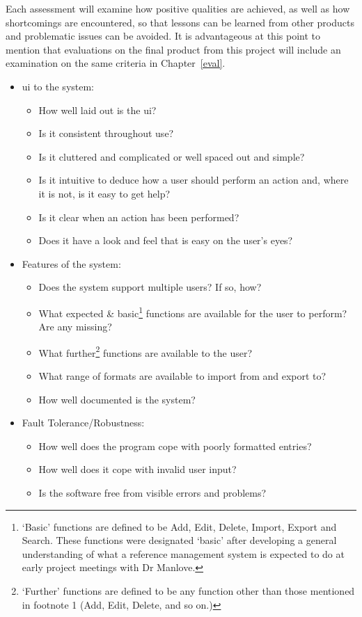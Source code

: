 \documentclass{l4proj}
\begin{document}
Each assessment will examine how positive qualities are achieved, as well as how shortcomings are encountered, so that lessons can be learned from other products and problematic issues can be avoided.  It is advantageous at this point to mention that evaluations on the final product from this project will include an examination on the same criteria in Chapter~\ref{eval}.
\begin{itemize}
	\item \gls{ui} to the system:
	\begin{itemize}
		\item How well laid out is the \gls{ui}? 
		\item Is it consistent throughout use?
		\item Is it cluttered and complicated or well spaced out and simple?
		\item Is it intuitive to deduce how a user should perform an action and, where it is not, is it easy to get help?
		\item Is it clear when an action has been performed?
		\item Does it have a look and feel that is easy on the user's eyes?
	\end{itemize}
	\item Features of the system:
	\begin{itemize}
		\item Does the system support multiple users? If so, how?
		\item What expected \& basic\footnote{`Basic' functions are defined to be Add, Edit, Delete, Import, Export and Search. These functions were designated `basic' after developing a general understanding of what a reference management system is expected to do at early project meetings with Dr Manlove.} functions are available for the user to perform? Are any missing?  %
		\item What further\footnote{`Further' functions are defined to be any function other than those mentioned in footnote 1 (Add, Edit, Delete, and so on.)} functions are available to the user? 
		\item What range of formats are available to import from and export to?
		\item How well documented is the system?
	\end{itemize}
	\item Fault Tolerance/Robustness:
	\begin{itemize}	
		\item How well does the program cope with poorly formatted entries?
		\item How well does it cope with invalid user input?
		\item Is the software free from visible errors and problems?
	\end{itemize}
\end{itemize}
\end{document}
